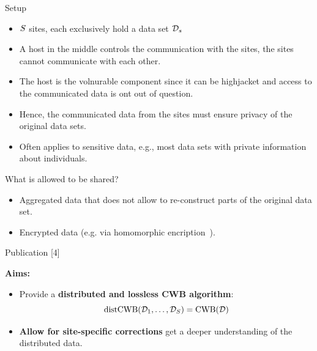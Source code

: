 \documentclass[t,10pt]{beamer}
\begin{document}
\begin{frame}{Setup}
  \begin{itemize}
    \item $S$ sites, each exclusively hold a data set $\mathcal{D}_s$
    \item A host in the middle controls the communication with the sites, the sites cannot communicate with each other.
    \item The host is the volnurable component since it can be highjacket and access to the communicated data is ont out of question.
    \item Hence, the communicated data from the sites must ensure privacy of the original data sets.
    \item Often applies to sensitive data, e.g., most data sets with private information about individuals.
  \end{itemize}
  What is allowed to be shared?
  \begin{itemize}
    \item Aggregated data that does not allow to re-construct parts of the original data set.
    \item Encrypted data (e.g. via homomorphic encription~\citep{gentry2009fully}).
  \end{itemize}
\end{frame}

\begin{frame}{Publication [4]}
  \vspace{-0.2cm}
  \begin{figure}
    \centering
  \end{figure}
  \vspace{-0.2cm}
  \textbf{Aims:}
  \begin{itemize}
    \item
      Provide a \textbf{distributed and lossless CWB algorithm}: \[\operatorname{distCWB}(\mathcal{D}_1, \dots, \mathcal{D}_S) = \operatorname{CWB}(\mathcal{D})\]
    \item
      \textbf{Allow for site-specific corrections} get a deeper understanding of the distributed data.
  \end{itemize}

\end{frame}
\end{document}
